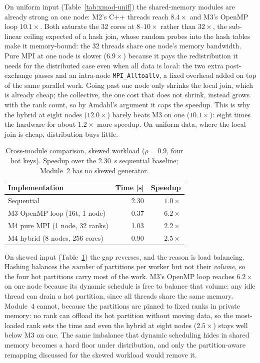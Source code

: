 \documentclass[10pt,twocolumn,a4paper]{article}
\begin{document}
On uniform input (Table~\ref{tab:xmod-unif}) the shared-memory modules
are already strong on one node: M2's C++ threads reach $8.4\times$ and
M3's OpenMP loop $10.1\times$. Both saturate the 32 cores at $8$--$10\times$
rather than $32\times$, the sub-linear ceiling expected of a hash join,
whose random probes into the hash tables make it memory-bound: the 32
threads share one node's memory bandwidth. Pure MPI at one node is slower
($6.9\times$) because it pays the redistribution it needs for the
distributed case even when all data is local: the two extra post-exchange
passes and an intra-node \texttt{MPI\_Alltoallv}, a fixed overhead added
on top of the same parallel work. Going past one node only shrinks the
local join, which is already cheap; the collective, the one cost that
does not shrink, instead grows with the rank count, so by Amdahl's
argument it caps the speedup. This is why the hybrid at eight nodes
($12.0\times$) barely beats M3 on one ($10.1\times$): eight times the
hardware for about $1.2\times$ more speedup. On uniform data, where the
local join is cheap, distribution buys little.

\begin{table}[t]
  \centering\small
  \caption{Cross-module comparison, skewed workload ($\rho=0.9$, four hot
    keys). Speedup over the \SI{2.30}{s} sequential baseline; Module~2 has
    no skewed generator.}
  \label{tab:xmod-skew}
  \begin{tabular}{lrr}
    \toprule
    Implementation & Time [s] & Speedup\\
    \midrule
    Sequential                     & 2.30 & $1.0\times$\\
    M3 OpenMP loop (16t, 1 node)   & 0.37 & $6.2\times$\\
    M4 pure MPI (1 node, 32 ranks) & 1.03 & $2.2\times$\\
    M4 hybrid (8 nodes, 256 cores) & 0.90 & $2.5\times$\\
    \bottomrule
  \end{tabular}
\end{table}

On skewed input (Table~\ref{tab:xmod-skew}) the gap reverses, and the
reason is load balancing. Hashing balances the \emph{number} of
partitions per worker but not their \emph{volume}, so the four hot
partitions carry most of the work. M3's OpenMP loop reaches $6.2\times$
on one node because its dynamic schedule is free to balance that volume:
any idle thread can drain a hot partition, since all threads share the
same memory. Module~4 cannot, because the partitions are pinned to fixed
ranks in private memory: no rank can offload its hot partition without
moving data, so the most-loaded rank sets the time and even the hybrid at
eight nodes ($2.5\times$) stays well below M3 on one. The same imbalance
that dynamic scheduling hides in shared memory becomes a hard floor under
distribution, and only the partition-aware remapping discussed for the
skewed workload would remove it.
\end{document}
